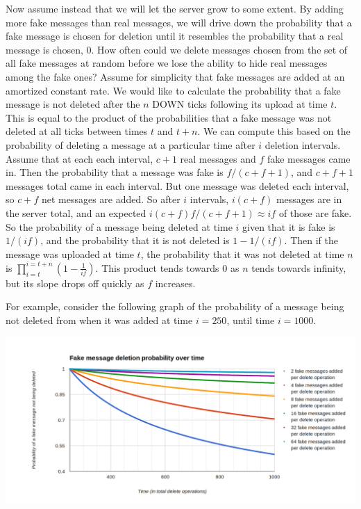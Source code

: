 \documentclass[pageno]{jpaper}
\begin{document}
Now assume instead that we will let the server grow to some extent. By adding more fake messages than real messages, we will drive down the probability that a fake message is chosen for deletion until it resembles the probability that a real message is chosen, 0. How often could we delete messages chosen from the set of all fake messages at random before we lose the ability to hide real messages among the fake ones? Assume for simplicity that fake messages are added at an amortized constant rate. We would like to calculate the probability that a fake message is not deleted after the $n$ DOWN ticks following its upload at time $t$. This is equal to the product of the probabilities that a fake message was not deleted at all ticks between times $t$ and $t+n$. We can compute this based on the probability of deleting a message at a particular time after $i$ deletion intervals. Assume that at each each interval, $c+1$ real messages and $f$ fake messages came in. Then the probability that a message was fake is $f/(c+f+1)$, and $c+f+1$ messages total came in each interval. But one message was deleted each interval, so $c+f$ net messages are added. So after $i$ intervals, $i(c+f)$ messages are in the server total, and an expected $i(c+f)f/(c+f+1)\approx if$ of those are fake. So the probability of a message being deleted at time $i$ given that it is fake is $1/(if)$, and the probability that it is not deleted is $1-1/(if)$. Then if the message was uploaded at time $t$, the probability that it was not deleted at time $n$ is $\displaystyle\prod_{i=t}^{i=t+n}(1-\frac{1}{if})$. This product tends towards 0 as $n$ tends towards infinity, but its slope drops off quickly as $f$ increases.

For example, consider the following graph of the probability of a message being not deleted from when it was added at time $i=250$, until time $i=1000$.

\includegraphics[width=\textwidth]{many_lines_2}
\end{document}
